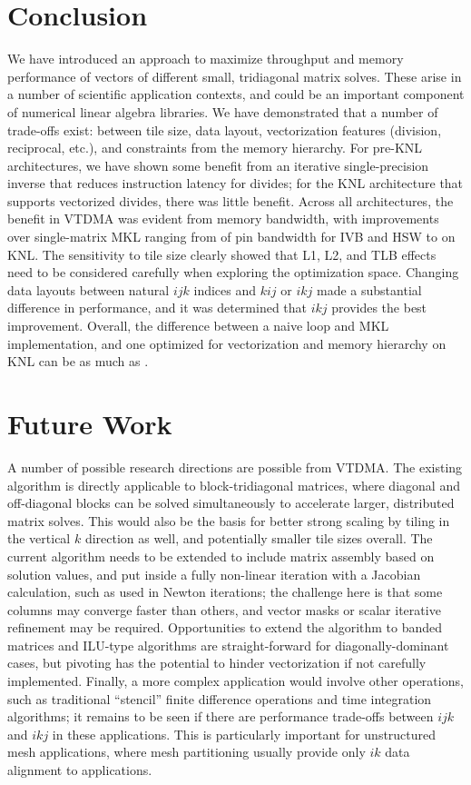 \documentclass[conference]{IEEEtran}
\begin{document}
\section{Conclusion}
We have introduced an approach to maximize throughput and memory
  performance of vectors of different small, tridiagonal matrix solves.
These arise in a number of scientific application contexts, and could
  be an important component of numerical linear algebra libraries.
We have demonstrated that a number of trade-offs exist: between tile size,
  data layout, vectorization features (division, reciprocal, etc.),
  and constraints from the memory hierarchy.
For pre-KNL architectures, we have shown some benefit from an iterative
  single-precision inverse that reduces instruction latency for divides; 
  for the KNL architecture that supports vectorized divides, 
  there was little benefit.
Across all architectures, the benefit in VTDMA was evident from 
  memory bandwidth, with improvements over single-matrix MKL ranging 
  from  of pin bandwidth for IVB and HSW to 
   on KNL.
The sensitivity to tile size clearly showed that L1, L2, and TLB effects
  need to be considered carefully when exploring the optimization space.
Changing data layouts between natural \(ijk\) indices and \(kij\) 
  or \(ikj\) made a substantial difference in performance, 
  and it was determined that \(ikj\) provides the best 
   improvement.
Overall, the difference between a naive loop and MKL implementation,
  and one optimized for vectorization and memory hierarchy on KNL 
  can be as much as .

\section{Future Work}
A number of possible research directions are possible from VTDMA.
The existing algorithm is directly applicable to block-tridiagonal matrices,
  where diagonal and off-diagonal blocks can be solved simultaneously
  to accelerate larger, distributed matrix solves.
This would also be the basis for better strong scaling by tiling in
  the vertical $k$ direction as well, and potentially smaller
  tile sizes overall. 
The current algorithm needs to be extended to include matrix assembly
  based on solution values, and put inside a fully non-linear iteration
  with a Jacobian calculation, such as used in Newton iterations;
  the challenge here is that some columns may converge faster than
  others, and vector masks or scalar iterative refinement may be required.
Opportunities to extend the algorithm to banded matrices and ILU-type 
  algorithms are straight-forward for diagonally-dominant cases, but
  pivoting has the potential to hinder vectorization if not carefully
  implemented.
Finally, a more complex application would involve other operations,
  such as traditional ``stencil'' finite difference operations and
  time integration algorithms; it remains to be seen if there are
  performance trade-offs between \(ijk\) and \(ikj\) in 
  these applications.
This is particularly important for unstructured mesh applications,
  where mesh partitioning usually provide only \(ik\) 
  data alignment to applications.
\end{document}
